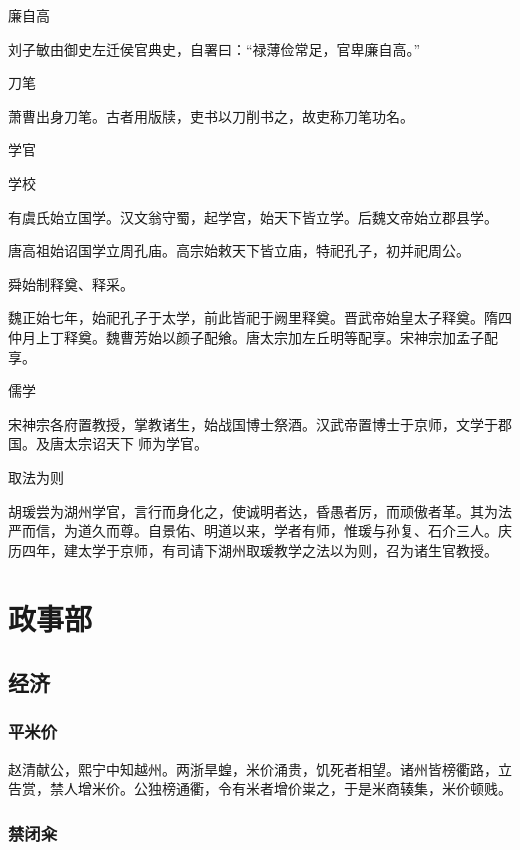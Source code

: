 \documentclass[a4paper,12pt,UTF8,twoside]{ctexbook}
\begin{document}
    廉自高
    
    刘子敏由御史左迁侯官典史，自署曰：“禄薄俭常足，官卑廉自高。”
    
    刀笔
    
    萧曹出身刀笔。古者用版牍，吏书以刀削书之，故吏称刀笔功名。
    
    学官
    
    学校
    
    有虞氏始立国学。汉文翁守蜀，起学宫，始天下皆立学。后魏文帝始立郡县学。
    
    唐高祖始诏国学立周孔庙。高宗始敕天下皆立庙，特祀孔子，初并祀周公。
    
    舜始制释奠、释采。
    
    魏正始七年，始祀孔子于太学，前此皆祀于阙里释奠。晋武帝始皇太子释奠。隋四仲月上丁释奠。魏曹芳始以颜子配飨。唐太宗加左丘明等配享。宋神宗加孟子配享。
    
    儒学
    
    宋神宗各府置教授，掌教诸生，始战国博士祭酒。汉武帝置博士于京师，文学于郡国。及唐太宗诏天下师为学官。
    
    取法为则
    
    胡瑗尝为湖州学官，言行而身化之，使诚明者达，昏愚者厉，而顽傲者革。其为法严而信，为道久而尊。自景佑、明道以来，学者有师，惟瑗与孙复、石介三人。庆历四年，建太学于京师，有司请下湖州取瑗教学之法以为则，召为诸生官教授。
    
    
    
    \part{政事部}
    
    \chapter{经济}
    
    \section{平米价}
    
    赵清献公，熙宁中知越州。两浙旱蝗，米价涌贵，饥死者相望。诸州皆榜衢路，立告赏，禁人增米价。公独榜通衢，令有米者增价粜之，于是米商辏集，米价顿贱。
    
    \section{禁闭籴}
    
\end{document}
